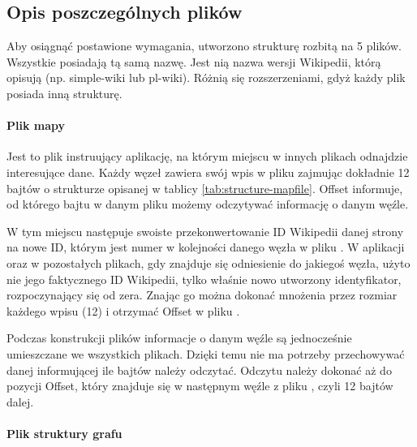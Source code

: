 \subsection{Opis poszczególnych plików}
Aby osiągnąć postawione wymagania, utworzono strukturę rozbitą na 5 plików. Wszystkie posiadają tą samą nazwę. Jest nią nazwa wersji Wikipedii, którą opisują (np. simple-wiki lub pl-wiki). Różnią się rozszerzeniami, gdyż każdy plik posiada inną strukturę.

\paragraph{Plik mapy }
Jest to plik instruujący aplikację, na którym miejscu w innych plikach odnajdzie interesujące dane. Każdy węzeł zawiera swój wpis w pliku  zajmując dokładnie 12 bajtów o strukturze opisanej w tablicy \ref{tab:structure-mapfile}. Offset informuje, od którego bajtu w danym pliku możemy odczytywać informację o danym węźle.


W tym miejscu następuje swoiste przekonwertowanie ID Wikipedii danej strony na nowe ID, którym jest numer w kolejności danego węzła w pliku . W aplikacji oraz w pozostałych plikach, gdy znajduje się odniesienie do jakiegoś węzła, użyto nie jego faktycznego ID Wikipedii, tylko właśnie nowo utworzony identyfikator, rozpoczynający się od zera. Znając go można dokonać mnożenia przez rozmiar każdego wpisu (12) i otrzymać Offset w pliku .

Podczas konstrukcji plików informacje o danym węźle są jednocześnie umieszczane we wszystkich plikach. Dzięki temu nie ma potrzeby przechowywać danej informującej ile bajtów należy odczytać. Odczytu należy dokonać aż do pozycji Offset, który znajduje się w następnym węźle z pliku , czyli 12 bajtów dalej.

\paragraph{Plik struktury grafu }

